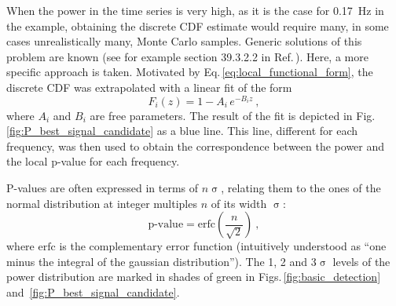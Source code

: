 When the power in the time series is very high, as it is the case for \SI{0.17}{\hertz} in the example, obtaining the discrete CDF estimate would require many, in some cases unrealistically many, Monte Carlo samples.
Generic solutions of this problem are known (see for example section 39.3.2.2 in Ref.\,\cite{PDG2016}).
Here, a more specific approach is taken.
Motivated by Eq.\,\ref{eq:local_functional_form}, the discrete CDF was extrapolated with a linear fit of the form
\begin{equation}
  F_i(z) = 1 - A_i \, e^{-B_i z} \ ,
\end{equation}
where $A_i$ and $B_i$ are free parameters.
The result of the fit is depicted in Fig.\,\ref{fig:P_best_signal_candidate} as a blue line.
This line, different for each frequency, was then used to obtain the correspondence between the power and the local p-value for each frequency.



P-values are often expressed in terms of $n\upsigma$, relating them to the ones of the normal distribution at integer multiples $n$ of its width $\upsigma$:
\begin{equation}
  \text{p-value} = \mathrm{erfc}\left( \frac{n}{\sqrt{2}} \right)\ ,
\end{equation}
where $\mathrm{erfc}$ is the complementary error function (intuitively understood as ``one minus the integral of the gaussian distribution'').
The 1, 2 and 3$\upsigma$ levels of the power distribution are marked in shades of green in Figs.\,\ref{fig:basic_detection} and~\ref{fig:P_best_signal_candidate}.

